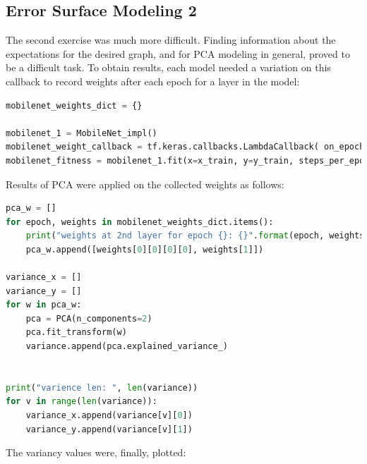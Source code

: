 \documentclass{article}
\begin{document}
\subsection{Error Surface Modeling 2}
The second exercise was much more difficult.
Finding information about the expectations for the desired graph, and for PCA modeling in general, proved to be a difficult task.
To obtain results, each model needed a variation on this callback to record weights after each epoch for a layer in the model:

\begin{lstlisting}[language=Python]
mobilenet_weights_dict = {}

mobilenet_1 = MobileNet_impl()
mobilenet_weight_callback = tf.keras.callbacks.LambdaCallback( on_epoch_end=lambda epoch, logs: mobilenet_weights_dict.update({epoch:mobilenet_1.layers[2].get_weights()}))
mobilenet_fitness = mobilenet_1.fit(x=x_train, y=y_train, steps_per_epoch=128, epochs=15, verbose=1, validation_data=(x_test, y_test), callbacks=mobilenet_weight_callback)
\end{lstlisting}

Results of PCA were applied on the collected weights as follows:

\begin{lstlisting}[language=Python]
pca_w = []
for epoch, weights in mobilenet_weights_dict.items():
    print("weights at 2nd layer for epoch {}: {}".format(epoch, weights))
    pca_w.append([weights[0][0][0][0], weights[1]])

variance_x = []
variance_y = []
for w in pca_w:
    pca = PCA(n_components=2)
    pca.fit_transform(w)
    variance.append(pca.explained_variance_)


print("varience len: ", len(variance))
for v in range(len(variance)):
    variance_x.append(variance[v][0])
    variance_y.append(variance[v][1])
\end{lstlisting}

The variancy values were, finally, plotted:
\end{document}
